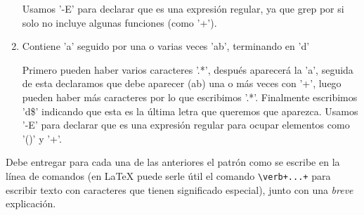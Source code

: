 \documentclass[spanish, fleqn]{article}
\begin{document}
\begin{enumerate}
    Usamos '-E' para declarar que es una expresión regular, ya que grep por si solo no incluye algunas funciones (como '+').
  \item
    Contiene 'a' seguido por una o varias veces 'ab', terminando en 'd'
    
    
    Primero pueden haber varios caracteres '.*', después aparecerá la 'a', seguida de esta declaramos que debe aparecer (ab) una o más veces con '+', luego pueden haber más caracteres por lo que escribimos '.*'. Finalmente escribimos 'd\$' indicando que esta es la última letra que queremos que aparezca.
    Usamos '-E' para declarar que es una expresión regular para ocupar elementos como '()' y '+'.
  \end{enumerate}
  
  
  Debe entregar para cada una de las anteriores el patrón
  como se escribe en la línea de comandos
  (en \LaTeX{} puede serle útil el comando \verb!\verb+...+!
   para escribir texto con caracteres que tienen significado especial),
  junto con una \emph{breve} explicación.
\end{document}

